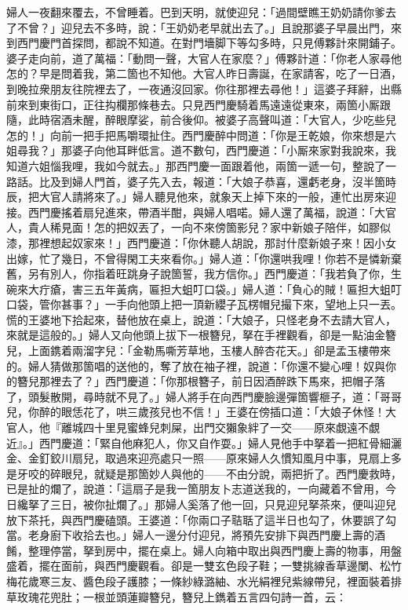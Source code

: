 婦人一夜翻來覆去，不曾睡着。巴到天明，就使迎兒：「過間壁瞧王奶奶請你爹去了不曾？」迎兒去不多時，說：「王奶奶老早就出去了。」且說那婆子早晨出門，來到西門慶門首探問，都說不知道。在對門墻脚下等勾多時，只見傅夥計來開鋪子。婆子走向前，道了萬福：「動問一聲，大官人在家麼？」傅夥計道：「你老人家尋他怎的？早是問着我，第二箇也不知他。大官人昨日壽誕，在家請客，吃了一日酒，到晚拉衆朋友往院裡去了，一夜通沒回家。你往那裡去尋他！」這婆子拜辭，出縣前來到東街口，正往抅欄那條巷去。只見西門慶騎着馬遠遠從東來，兩箇小厮跟隨，此時宿酒未醒，醉眼摩娑，前合後仰。被婆子高聲叫道：「大官人，少吃些兒怎的！」向前一把手把馬嚼環扯住。西門慶醉中問道：「你是王乾娘，你來想是六姐尋我？」那婆子向他耳畔低言。道不數句，西門慶道：「小厮來家對我說來，我知道六姐惱我哩，我如今就去。」那西門慶一面跟着他，兩箇一遞一句，整說了一路話。比及到婦人門首，婆子先入去，報道：「大娘子恭喜，還虧老身，沒半箇時辰，把大官人請將來了。」婦人聽見他來，就象天上掉下來的一般，連忙出房來迎接。西門慶搖着扇兒進來，帶酒半酣，與婦人唱喏。婦人還了萬福，說道：「大官人，貴人稀見面！怎的把奴丟了，一向不來傍箇影兒？家中新娘子陪伴，如膠似漆，那裡想起奴家來！」西門慶道：「你休聽人胡說，那討什麼新娘子來！因小女出嫁，忙了幾日，不曾得閑工夫來看你。」婦人道：「你還哄我哩！你若不是憐新棄舊，另有別人，你指着旺跳身子說箇誓，我方信你。」西門慶道：「我若負了你，生碗來大疔瘡，害三五年黃病，匾担大蛆叮口袋。」婦人道：「負心的賊！匾担大蛆叮口袋，管你甚事？」一手向他頭上把一頂新纓子瓦楞帽兒撮下來，望地上只一丟。慌的王婆地下拾起來，替他放在桌上，說道：「大娘子，只怪老身不去請大官人，來就是這般的。」婦人又向他頭上拔下一根簪兒，拏在手裡觀看，卻是一點油金簪兒，上面鎸着兩溜字兒：「金勒馬嘶芳草地，玉樓人醉杏花天。」{}卻是孟玉樓帶來的。婦人猜做那箇唱的送他的，奪了放在袖子裡，說道：「你還不變心哩！奴與你的簪兒那裡去了？」西門慶道：「你那根簪子，前日因酒醉跌下馬來，把帽子落了，頭髮散開，尋時就不見了。」婦人將手在向西門慶臉邊彈箇響榧子，道：「哥哥兒，你醉的眼恁花了，哄三歲孩兒也不信！」王婆在傍插口道：「大娘子休怪！大官人，他『離城四十里見蜜蜂兒刺屎，出門交獺象絆了一交——原來覷遠不覷近』。」{}西門慶道：「緊自他麻犯人，你又自作耍。」婦人見他手中拏着一把紅骨細灑金、金釘鉸川扇兒，取過來迎亮處只一照——原來婦人久慣知風月中事，見扇上多是牙咬的碎眼兒，就疑是那箇妙人與他的——不由分說，兩把折了。西門慶救時，已是扯的爛了，說道：「這扇子是我一箇朋友卜志道送我的，{}一向藏着不曾用，今日纔拏了三日，被你扯爛了。」那婦人奚落了他一回，只見迎兒拏茶來，便叫迎兒放下茶托，與西門慶磕頭。王婆道：「你兩口子聐聒了這半日也勾了，休要誤了勾當。老身廚下收拾去也。」婦人一邊分付迎兒，將預先安排下與西門慶上壽的酒餚，整理停當，拏到房中，擺在桌上。婦人向箱中取出與西門慶上壽的物事，用盤盛着，擺在面前，與西門慶觀看。卻是一雙玄色段子鞋；一雙挑線香草邊闌、松竹梅花歲寒三友、醬色段子護膝；一條紗綠潞紬、水光絹裡兒紫線帶兒，裡面裝着排草玫瑰花兜肚；一根並頭蓮瓣簪兒，簪兒上鐫着五言四句詩一首，云：

